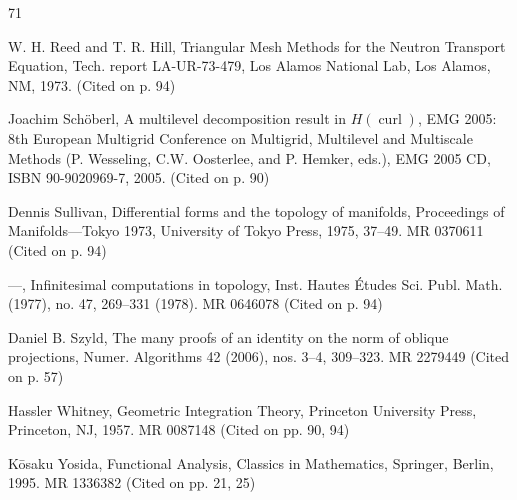 \begin{MBSourceBibliography}{71}
\item\label{bib:source-65}W. H. Reed and T. R. Hill, Triangular Mesh Methods for the Neutron Transport Equation, Tech. report LA-UR-73-479, Los Alamos National Lab, Los Alamos, NM, 1973. (Cited on p. 94)

\item\label{bib:source-66}Joachim Schöberl, A multilevel decomposition result in $H(\operatorname{curl})$, EMG 2005: 8th European Multigrid Conference on Multigrid, Multilevel and Multiscale Methods (P. Wesseling, C.W. Oosterlee, and P. Hemker, eds.), EMG 2005 CD, ISBN 90-9020969-7, 2005. (Cited on p. 90)

\item\label{bib:source-67}Dennis Sullivan, Differential forms and the topology of manifolds, Proceedings of Manifolds—Tokyo 1973, University of Tokyo Press, 1975, 37–49. MR 0370611 (Cited on p. 94)

\item\label{bib:source-68}—, Infinitesimal computations in topology, Inst. Hautes Études Sci. Publ. Math. (1977), no. 47, 269–331 (1978). MR 0646078 (Cited on p. 94)

\item\label{bib:source-69}Daniel B. Szyld, The many proofs of an identity on the norm of oblique projections, Numer. Algorithms 42 (2006), nos. 3–4, 309–323. MR 2279449 (Cited on p. 57)

\item\label{bib:source-70}Hassler Whitney, Geometric Integration Theory, Princeton University Press, Princeton, NJ, 1957. MR 0087148 (Cited on pp. 90, 94)

\item\label{bib:source-71}Kōsaku Yosida, Functional Analysis, Classics in Mathematics, Springer, Berlin, 1995. MR 1336382 (Cited on pp. 21, 25)
\end{MBSourceBibliography}

